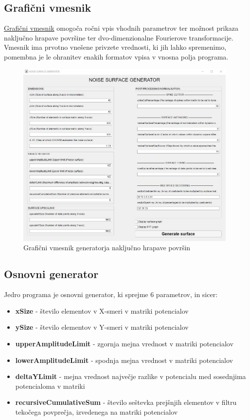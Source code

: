 \documentclass[a4paper,twoside,openright,12pt,slovene]{book}
\begin{document}
\subsection{Grafični vmesnik}
\label{gui}

\hyperref[fig:gui]{Grafični vmesnik} omogoča ročni vpis vhodnih parametrov ter možnost prikaza naključno hrapave površine ter dvo-dimenzionalne Fourierove transformacije. Vmesnik ima prvotno vnešene privzete vrednosti, ki jih lahko spremenimo, pomembna je le ohranitev enakih formatov vpisa v vnosna polja programa.

\begin{figure}[H]
    \centering
    \includegraphics[width=110mm]{Slike/GUI.jpg}
    \caption{Grafični vmesnik generatorja naključno hrapave površin}
    \label{fig:gui}
\end{figure}


\subsection{Osnovni generator}
\label{osnovniGenerator}

Jedro programa je osnovni generator, ki sprejme 6 parametrov, in sicer:

\begin{itemize}
    \setlength\itemsep{0.1em}
    \item \textbf{xSize} - število elementov v X-smeri v matriki potencialov
    \item \textbf{ySize} - število elementov v Y-smeri v matriki potencialov
    \item \textbf{upperAmplitudeLimit} - zgornja mejna vrednost v matriki potencialov
    \item \textbf{lowerAmplitudeLimit} - spodnja mejna vrednost v matriki potencialov
    \item \textbf{deltaYLimit}  - mejna vrednost največje razlike v potencialu med sosednjima potencialoma v matriki
    \item \textbf{recursiveCumulativeSum} - število seštevka prejšnjih elementov v filtru tekočega povprečja, izvedenega na matriki potencialov 
\end{itemize}
\end{document}

